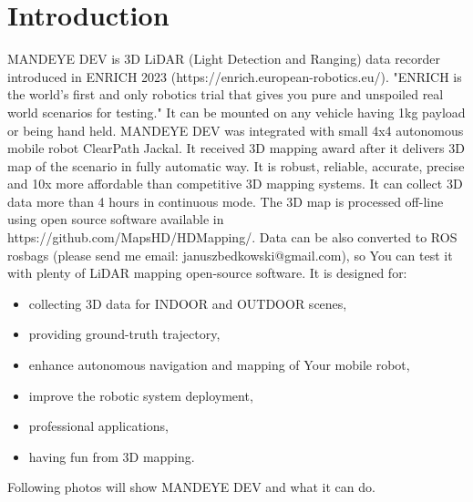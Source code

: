 \chapter{Introduction}
MANDEYE DEV is 3D LiDAR (Light Detection and Ranging) data recorder introduced in ENRICH 2023 (https://enrich.european-robotics.eu/).
"ENRICH is the world's first and only robotics trial that gives you pure and unspoiled real world scenarios for testing." 
It can be mounted on any vehicle having 1kg payload or being hand held. 
MANDEYE DEV was integrated with small 4x4 autonomous mobile robot ClearPath Jackal. 
It received 3D mapping award after it delivers 3D map of the scenario in fully automatic way. 
It is robust, reliable, accurate, precise and 10x more affordable than competitive 3D mapping systems.
It can collect 3D data more than 4 hours in continuous mode.
The 3D map is processed off-line using open source software available in https://github.com/MapsHD/HDMapping/.
Data can be also converted to ROS rosbags (please send me email: januszbedkowski@gmail.com), so You can test it with plenty of LiDAR mapping open-source software.
It is designed for:

\begin{itemize}
	\item collecting 3D data for INDOOR and OUTDOOR scenes,
	\item providing ground-truth trajectory,
	\item enhance autonomous navigation and mapping of Your mobile robot,
	\item improve the robotic system deployment,
	\item professional applications,
	\item having fun from 3D mapping.
\end{itemize}
Following photos will show MANDEYE DEV and what it can do.


